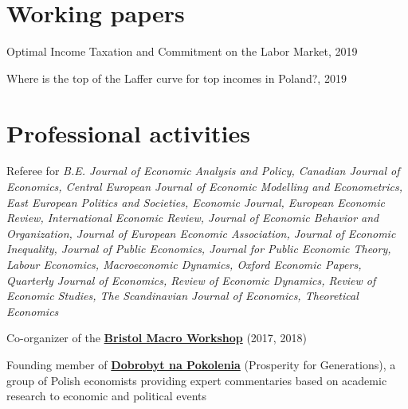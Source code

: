 \documentclass[letterpaper]{article}
\renewenvironment{itemize}{
  \begin{list}{}{
    \setlength{\leftmargin}{1.5em}
  }
}{
  \end{list}
}
\begin{document}
\section*{Working papers}


\begin{itemize}
\item Optimal Income Taxation and Commitment on the Labor Market, 2019
\item Where is the top of the Laffer curve for top incomes in Poland?, 2019
\end{itemize}



\section*{Professional activities}
\begin{itemize}
\item Referee for \textit{B.E. Journal of Economic Analysis and Policy, Canadian Journal of Economics, Central European Journal of Economic Modelling and Econometrics, East European Politics and Societies, Economic Journal, European Economic Review, International Economic Review, Journal of Economic Behavior and Organization, Journal of European Economic Association, Journal of Economic Inequality, Journal of Public Economics, Journal for Public Economic Theory, Labour Economics, Macroeconomic Dynamics, Oxford Economic Papers, Quarterly Journal of Economics, Review of Economic Dynamics, Review of Economic Studies, The Scandinavian Journal of Economics, Theoretical Economics}

\item Co-organizer of the \href{http://pdoligalski.github.io/BristolMacro/index.html}{\textbf{Bristol Macro Workshop}} (2017, 2018)
\item Founding member of \href{https://napokolenia.pl}{\textbf{Dobrobyt na Pokolenia}} (Prosperity for Generations), a group of Polish economists providing expert commentaries based on academic research
 to economic and political events 
\end{itemize}
\end{document}
